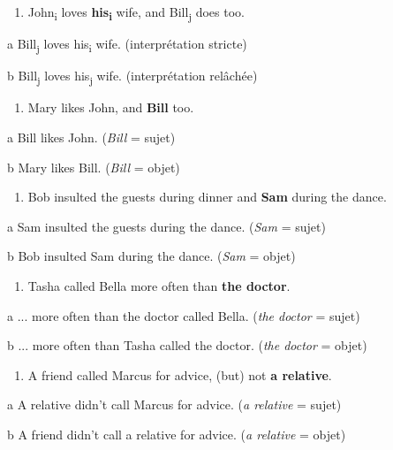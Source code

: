 \begin{enumerate}
\item \label{bkm:Ref286955860}John\textsubscript{i} loves \textbf{his}\textbf{\textsubscript{i}} wife, and Bill\textsubscript{j} does too.  


\end{enumerate}
a  Bill\textsubscript{j} loves his\textsubscript{i} wife. (interprétation stricte)

  b  Bill\textsubscript{j} loves his\textsubscript{j} wife. (interprétation relâchée)    


\begin{enumerate}
\item \label{bkm:Ref286958052}Mary likes John, and \textbf{Bill} too.  


\end{enumerate}
a  Bill likes John. (\textit{Bill} = sujet)

  b  Mary likes Bill. (\textit{Bill} = objet)


\begin{enumerate}
\item \label{bkm:Ref286957630}Bob insulted the guests during dinner and \textbf{Sam} during the dance.


\end{enumerate}
a  Sam insulted the guests during the dance. (\textit{Sam} = sujet) 

  b  Bob insulted Sam during the dance. (\textit{Sam} = objet)


\begin{enumerate}
\item Tasha called Bella more often than \textbf{the doctor}.


\end{enumerate}
a  ... more often than the doctor called Bella. (\textit{the doctor} = sujet) 

  b  ... more often than Tasha called the doctor. (\textit{the doctor} = objet)


\begin{enumerate}
\item \label{bkm:Ref286957659}A friend called Marcus for advice, (but) not \textbf{a relative}.


\end{enumerate}
a  A relative didn't call Marcus for advice. (\textit{a relative} = sujet) 

  b  A friend didn't call a relative for advice. (\textit{a relative} = objet)

